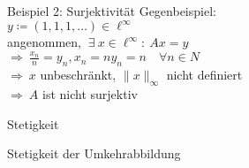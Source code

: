 \documentclass[AERbeamer%
,handout%
,optBeamerClassicFormat%
,optLeftEquations   %
]{AERlatex}
\begin{document}
%
    \begin{frame}{Beispiel 2: Surjektivität}
        \setlength{\baselineskip}{1.6\baselineskip}
        Gegenbeispiel: \\
        $y\coloneqq(1,1,1, \ldots) \in \ell^{\infty}$ \\ \pause
        angenommen, $~ \exists ~ x \in \ell^{\infty}: ~ A x=y$ \\ \pause
        $\Rightarrow ~ \frac{x_n}{n}=y_n, x_n=n y_n=n \quad \forall n \in N$ \\ \pause
        $\Rightarrow ~ x$ unbeschränkt, $\|x\|_{\infty}$ nicht definiert \\ \pause
        $\Rightarrow ~ A$ ist nicht surjektiv
    \end{frame}
%
    \begin{frame}{Stetigkeit}

    \end{frame}
%
    \begin{frame}{Stetigkeit der Umkehrabbildung}

    \end{frame}
%
%
%
\end{document}
